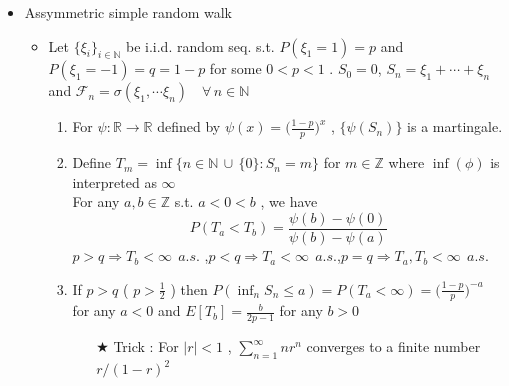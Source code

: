 \documentclass[12pt, A4]{article}
\newcommand{\trick}{$\bigstar$}
\newcommand{\N}{\mathbb{N}}
\newcommand{\R}{\mathbb{R}}
\newcommand{\F}{\mathcal{F}}
\newcommand{\union}{\,\cup\,}
\newcommand{\foranyn}{\quad \forall \, n\in \N}
\begin{document}
\begin{itemize}
\begin{itemize}
	\end{itemize}
	\item Assymmetric simple random walk
	\begin{itemize}
		\item Let $\{\xi_i\}_{i\in \N}$ be i.i.d. random seq. s.t. $P(\xi_1=1)=p$ and $P(\xi_1=-1)=q=1-p$ for some $0<p<1$ . $S_0=0$, $S_n=\xi_1+\cdots+\xi_n$ and $\F_n=\sigma(\xi_1, \cdots \xi_n)\foranyn$
		\begin{enumerate}
			\item For $\psi:\R \rightarrow \R$ defined by $\psi(x)=\big(\frac{1-p}{p}\big)^x$ , $\{\psi(S_n)\}$ is a martingale.
			\item Define $T_{m}=\inf\{n\in \N\union\{0\} :S_n=m \}$ for $m\in \mathbb{Z}$ where $\inf(\phi)$ is interpreted as $\infty$ \\For any $ a,b\in \mathbb{Z}$ s.t. $a<0<b$ , we have $$P(T_a<T_b)=\frac{\psi(b)-\psi(0)}{\psi(b)-\psi(a)} $$
			$p>q\Rightarrow T_b<\infty\;\,a.s.$ \quad,\quad $p<q\Rightarrow T_a<\infty\;\,a.s.$\quad,\quad   $p=q\Rightarrow T_a, T_b<\infty\;\,a.s.$
			\item If $p>q$ ( $p>\frac{1}{2}$ ) then $P(\inf_n S_n\leq a)=P(T_a<\infty)=\big(\frac{1-p}{p}\big)^{-a}$ for any $a<0$ and $E[T_b]=\frac{b}{2p-1}$ for any $b>0$
			\begin{itemize}
				\item[\trick] Trick : For $|r|<1$ , $\sum_{n=1}^\infty nr^n$ converges to a finite number $r/(1-r)^2$ 
			\end{itemize}
		\end{enumerate}
	\end{itemize} 
\end{itemize}
\end{document}
